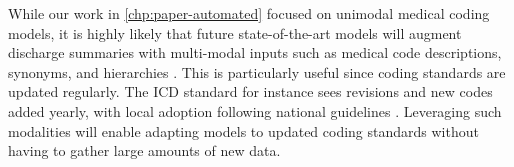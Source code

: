 While our work in \cref{chp:paper-automated} focused on unimodal medical coding models, it is highly likely that future state-of-the-art models will augment discharge summaries with multi-modal inputs such as medical code descriptions, synonyms, and hierarchies \parencite{kimReadAttendCode2021, mullenbachExplainablePredictionMedical2018, vuLabelAttentionModel2020, caoHyperCoreHyperbolicCograph2020, baoMedicalCodePrediction2021, yuanCodeSynonymsMatter2022,caoHyperCoreHyperbolicCograph2020, xieEHRCodingMultiscale2019}. 
This is particularly useful since coding standards are updated regularly. 
The ICD standard for instance sees revisions and new codes added yearly, with local adoption following national guidelines \parencite{centerfordiseasecontrolandpreventioncdc_international_2023}. 
Leveraging such modalities will enable adapting models to updated coding standards without having to gather large amounts of new data. 







